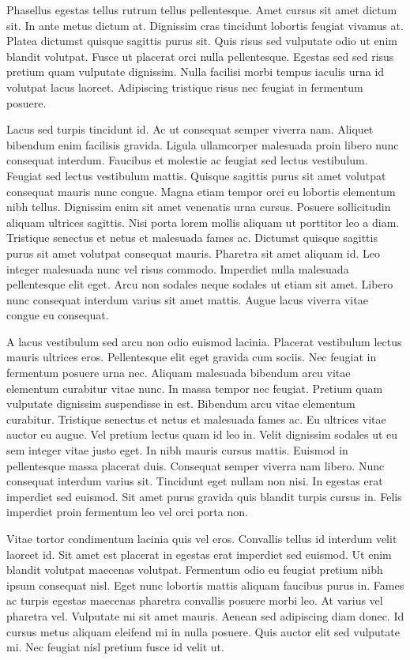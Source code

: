 \documentclass[11pt,a4paper]{article}
\begin{document}
Phasellus egestas tellus rutrum tellus pellentesque. Amet cursus sit amet dictum sit. In ante metus dictum at. Dignissim cras tincidunt lobortis feugiat vivamus at. Platea dictumst quisque sagittis purus sit. Quis risus sed vulputate odio ut enim blandit volutpat. Fusce ut placerat orci nulla pellentesque. Egestas sed sed risus pretium quam vulputate dignissim. Nulla facilisi morbi tempus iaculis urna id volutpat lacus laoreet. Adipiscing tristique risus nec feugiat in fermentum posuere.

Lacus sed turpis tincidunt id. Ac ut consequat semper viverra nam. Aliquet bibendum enim facilisis gravida. Ligula ullamcorper malesuada proin libero nunc consequat interdum. Faucibus et molestie ac feugiat sed lectus vestibulum. Feugiat sed lectus vestibulum mattis. Quisque sagittis purus sit amet volutpat consequat mauris nunc congue. Magna etiam tempor orci eu lobortis elementum nibh tellus. Dignissim enim sit amet venenatis urna cursus. Posuere sollicitudin aliquam ultrices sagittis. Nisi porta lorem mollis aliquam ut porttitor leo a diam. Tristique senectus et netus et malesuada fames ac. Dictumst quisque sagittis purus sit amet volutpat consequat mauris. Pharetra sit amet aliquam id. Leo integer malesuada nunc vel risus commodo. Imperdiet nulla malesuada pellentesque elit eget. Arcu non sodales neque sodales ut etiam sit amet. Libero nunc consequat interdum varius sit amet mattis. Augue lacus viverra vitae congue eu consequat.

A lacus vestibulum sed arcu non odio euismod lacinia. Placerat vestibulum lectus mauris ultrices eros. Pellentesque elit eget gravida cum sociis. Nec feugiat in fermentum posuere urna nec. Aliquam malesuada bibendum arcu vitae elementum curabitur vitae nunc. In massa tempor nec feugiat. Pretium quam vulputate dignissim suspendisse in est. Bibendum arcu vitae elementum curabitur. Tristique senectus et netus et malesuada fames ac. Eu ultrices vitae auctor eu augue. Vel pretium lectus quam id leo in. Velit dignissim sodales ut eu sem integer vitae justo eget. In nibh mauris cursus mattis. Euismod in pellentesque massa placerat duis. Consequat semper viverra nam libero. Nunc consequat interdum varius sit. Tincidunt eget nullam non nisi. In egestas erat imperdiet sed euismod. Sit amet purus gravida quis blandit turpis cursus in. Felis imperdiet proin fermentum leo vel orci porta non.

Vitae tortor condimentum lacinia quis vel eros. Convallis tellus id interdum velit laoreet id. Sit amet est placerat in egestas erat imperdiet sed euismod. Ut enim blandit volutpat maecenas volutpat. Fermentum odio eu feugiat pretium nibh ipsum consequat nisl. Eget nunc lobortis mattis aliquam faucibus purus in. Fames ac turpis egestas maecenas pharetra convallis posuere morbi leo. At varius vel pharetra vel. Vulputate mi sit amet mauris. Aenean sed adipiscing diam donec. Id cursus metus aliquam eleifend mi in nulla posuere. Quis auctor elit sed vulputate mi. Nec feugiat nisl pretium fusce id velit ut.
\end{document}
